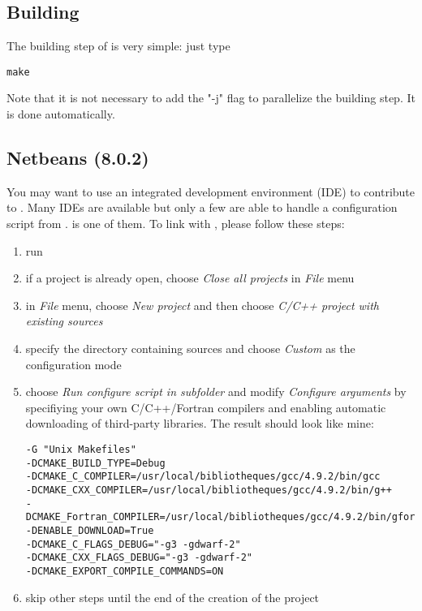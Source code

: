 \subsection{Building}

The building step of \Simol is very simple: just type
\begin{verbatim}
make
\end{verbatim}
Note that it is not necessary to add the "-j" flag to parallelize the building step. It is done automatically. 


\subsection{Netbeans (8.0.2)}

You may want to use an integrated development environment (IDE) to contribute to \Simol. Many IDEs are available but only a few are able to handle a configuration script from \CMake. \Netbeans is one of them. To link \Netbeans with \Simol, please follow these steps:
\begin{enumerate}
\item run \Netbeans
\item if a project is already open, choose \textit{Close all projects} in \textit{File} menu
\item in \textit{File} menu, choose \textit{New project} and then choose \textit{C/C++ project with existing sources}
\item specify the directory containing \Simol sources and choose \textit{Custom} as the configuration mode
\item choose \textit{Run configure script in subfolder} and modify \textit{Configure arguments} by specifiying your own C/C++/Fortran compilers and enabling automatic downloading of third-party libraries. The result should look like mine:
\begin{verbatim}
-G "Unix Makefiles" 
-DCMAKE_BUILD_TYPE=Debug 
-DCMAKE_C_COMPILER=/usr/local/bibliotheques/gcc/4.9.2/bin/gcc 
-DCMAKE_CXX_COMPILER=/usr/local/bibliotheques/gcc/4.9.2/bin/g++ 
-DCMAKE_Fortran_COMPILER=/usr/local/bibliotheques/gcc/4.9.2/bin/gfortran 
-DENABLE_DOWNLOAD=True 
-DCMAKE_C_FLAGS_DEBUG="-g3 -gdwarf-2" 
-DCMAKE_CXX_FLAGS_DEBUG="-g3 -gdwarf-2" 
-DCMAKE_EXPORT_COMPILE_COMMANDS=ON
\end{verbatim}
\item skip other steps until the end of the creation of the project
\end{enumerate}



